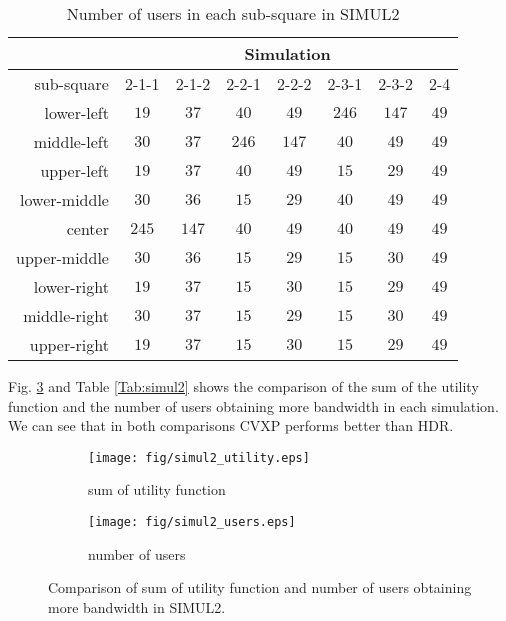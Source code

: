 	\begin{table} \small
		\centering \caption{Number of users in each sub-square in SIMUL2}
		\renewcommand\arraystretch{1.0}
		\begin{tabular}{|r||c||c||c||c||c||c||c|} %
			\hline
			&\multicolumn{7}{|c|}{Simulation} \\
			\hline	sub-square & 2-1-1 & 2-1-2 & 2-2-1 & 2-2-2 & 2-3-1 & 2-3-2 & 2-4 \\
			\hline
			\hline	lower-left & $19$ & $37$ & $40$ & $49$ & $246$ & $147$ & $49$ \\
			\hline	middle-left & $30$ & $37$ & $246$ & $147$ & $40$ & $49$ & $49$ \\
			\hline	upper-left & $19$ & $37$ & $40$ & $49$ & $15$ & $29$ & $49$ \\
			\hline	lower-middle & $30$ & $36$ & $15$ & $29$ & $40$ & $49$ & $49$ \\
			\hline	center & $245$ & $147$ & $40$ & $49$ & $40$ & $49$ & $49$ \\
			\hline	upper-middle & $30$ & $36$ & $15$ & $29$ & $15$ & $30$ & $49$ \\
			\hline	lower-right & $19$ & $37$ & $15$ & $30$ & $15$ & $29$ & $49$ \\
			\hline	middle-right & $30$ & $37$ & $15$ & $29$ & $15$ & $30$ & $49$ \\
			\hline	upper-right & $19$ & $37$ & $15$ & $30$ & $15$ & $29$ & $49$ \\
			\hline
		\end{tabular}\label{Tab:nouies2}
	\end{table}
	
	Fig. \ref{figure:simul2} and Table \ref{Tab:simul2} shows the comparison of the sum of the utility function and the number of users obtaining more bandwidth in each simulation. We can see that in both comparisons CVXP performs better than HDR.
	
	\begin{figure}
		\begin{center}
			\begin{subfigure}[b]{0.4\textwidth}
				\texttt{[image: fig/simul2\_utility.eps]}
				\caption{sum of utility function}
				\label{figure:simul2_a}
			\end{subfigure}
			\begin{subfigure}[b]{0.4\textwidth}
				\texttt{[image: fig/simul2\_users.eps]}
				\caption{number of users}
				\label{figure:simul2_b}
			\end{subfigure}
			\caption{Comparison of sum of utility function and number of users obtaining more bandwidth in SIMUL2.}
			\label{figure:simul2}
		\end{center}
	\end{figure}
	
